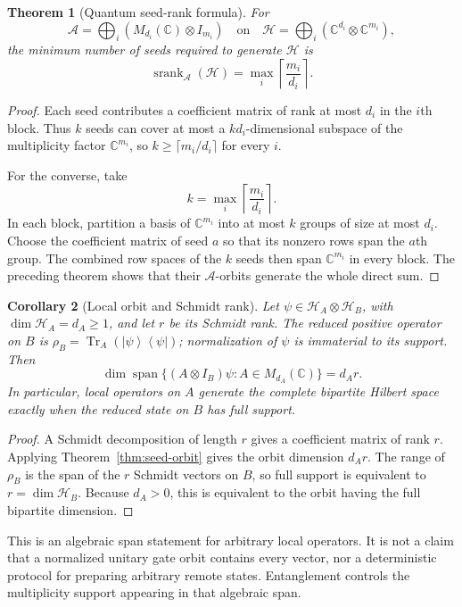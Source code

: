 \documentclass[11pt]{article}
\newtheorem{theorem}{Theorem}[section]
\newtheorem{corollary}[theorem]{Corollary}
\theoremstyle{definition}
\theoremstyle{remark}
\newcommand{\cA}{\mathcal A}
\newcommand{\cH}{\mathcal H}
\newcommand{\bbC}{\mathbb C}
\newcommand{\Tr}{\operatorname{Tr}}
\newcommand{\ket}[1]{\left|#1\right\rangle}
\newcommand{\bra}[1]{\left\langle#1\right|}
\begin{document}
\begin{theorem}[Quantum seed-rank formula]\label{thm:seed-rank}
For
\[
\cA=\bigoplus_i(M_{d_i}(\bbC)\otimes I_{m_i})
\quad\text{on}\quad
\cH=\bigoplus_i(\bbC^{d_i}\otimes\bbC^{m_i}),
\]
the minimum number of seeds required to generate $\cH$ is
\[
\boxed{
\operatorname{srank}_{\cA}(\cH)
=
\max_i\left\lceil\frac{m_i}{d_i}\right\rceil.
}
\]
\end{theorem}

\begin{proof}
Each seed contributes a coefficient matrix of rank at most $d_i$ in the $i$th block. Thus $k$ seeds can cover at most a $kd_i$-dimensional subspace of the multiplicity factor $\bbC^{m_i}$, so $k\ge\lceil m_i/d_i\rceil$ for every $i$.

For the converse, take
\[
k=\max_i\left\lceil\frac{m_i}{d_i}\right\rceil.
\]
In each block, partition a basis of $\bbC^{m_i}$ into at most $k$ groups of size at most $d_i$. Choose the coefficient matrix of seed $a$ so that its nonzero rows span the $a$th group. The combined row spaces of the $k$ seeds then span $\bbC^{m_i}$ in every block. The preceding theorem shows that their $\cA$-orbits generate the whole direct sum.
\end{proof}

\begin{corollary}[Local orbit and Schmidt rank]\label{thm:schmidt}
Let $\psi\in\cH_A\otimes\cH_B$, with $\dim\cH_A=d_A\ge1$, and let $r$ be its Schmidt rank. The reduced positive operator on $B$ is $\rho_B=\Tr_A(\ket\psi\bra\psi)$; normalization of $\psi$ is immaterial to its support. Then
\[
\boxed{
\dim\operatorname{span}\{(A\otimes I_B)\psi:A\in M_{d_A}(\bbC)\}
=d_A r.
}
\]
In particular, local operators on $A$ generate the complete bipartite Hilbert space exactly when the reduced state on $B$ has full support.
\end{corollary}

\begin{proof}
A Schmidt decomposition of length $r$ gives a coefficient matrix of rank $r$. Applying Theorem~\ref{thm:seed-orbit} gives the orbit dimension $d_A r$. The range of $\rho_B$ is the span of the $r$ Schmidt vectors on $B$, so full support is equivalent to $r=\dim\cH_B$. Because $d_A>0$, this is equivalent to the orbit having the full bipartite dimension.
\end{proof}

This is an algebraic span statement for arbitrary local operators. It is not a claim that a normalized unitary gate orbit contains every vector, nor a deterministic protocol for preparing arbitrary remote states. Entanglement controls the multiplicity support appearing in that algebraic span.
\end{document}
